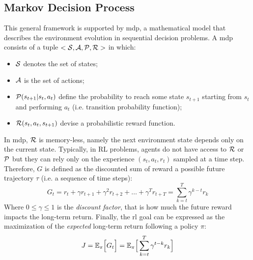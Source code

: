 \subsection{Markov Decision Process}
This general framework is supported by \ac{mdp}, 
 a mathematical model that describes the environment evolution in sequential decision problems. 
%
A \ac{mdp} consists of a tuple $<\mathcal{S}, \mathcal{A}, \mathcal{P}, \mathcal{R}>$ in which:
\begin{itemize}
  \item $\mathcal{S}$ denotes the set of states;
  \item $\mathcal{A}$ is the set of actions;
  \item $\mathcal{P}(s_{t + 1} | s_t, a_t)$ define the probability to reach some state $s_{t + 1}$ starting from $s_t$ and performing $a_t$ (i.e. transition probability function);
  \item $\mathcal{R}(s_t, a_t, s_{t+1})$ devise a probabilistic reward function.
\end{itemize}
In \ac{mdp}, $\mathcal{R}$ is memory-less, namely the next environment state depends only on the current state. 
Typically, in RL problems, agents do not have access to $\mathcal{R}$ or $\mathcal{P}$ but they can rely only on the experience $(s_t, a_t, r_t)$ sampled at a time step. 
Therefore, $G$ is defined as the discounted sum of reward a possible future trajectory $\tau$ (i.e. a sequence of time steps):
\begin{equation}
G_{t} = r_t + \gamma r_{t + 1} + \gamma^2 r_{t + 2} + \dots + \gamma^T r_{t + T} = \sum_{k = t}^T \gamma^{k-t} r_k
\end{equation}
Where $0 \leq \gamma \leq 1$ is the \emph{discount factor}, that is how much the future reward impacts the long-term return.
Finally, the \ac{rl} goal can be expressed as the maximization of the \emph{expected} long-term return following a policy $\pi$:
\begin{equation}
J = \mathbb{E_\pi}\Big[ G_t \Big] = \mathbb{E}_\pi \Big[ \sum_{k = t}^T \gamma^{t-k} r_k \Big] 
\end{equation}

